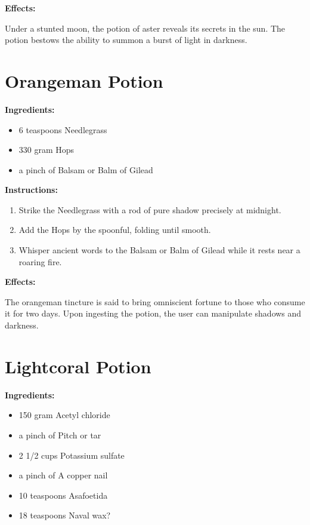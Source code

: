 \documentclass{article}
\begin{document}
\textbf{Effects:}

Under a stunted moon, the potion of aster reveals its secrets in the sun. The potion bestows the ability to summon a burst of light in darkness.

\newpage
\section*{Orangeman Potion}

\textbf{Ingredients:}

\begin{itemize}
  \item 6 teaspoons Needlegrass
  \item 330 gram Hops
  \item a pinch of Balsam or Balm of Gilead
\end{itemize}

\textbf{Instructions:}

\begin{enumerate}
  \item Strike the Needlegrass with a rod of pure shadow precisely at midnight.
  \item Add the Hops by the spoonful, folding until smooth.
  \item Whisper ancient words to the Balsam or Balm of Gilead while it rests near a roaring fire.
\end{enumerate}

\textbf{Effects:}

The orangeman tincture is said to bring omniscient fortune to those who consume it for two days. Upon ingesting the potion, the user can manipulate shadows and darkness.

\newpage
\section*{Lightcoral Potion}

\textbf{Ingredients:}

\begin{itemize}
  \item 150 gram Acetyl chloride
  \item a pinch of Pitch or tar
  \item 2 1/2 cups Potassium sulfate
  \item a pinch of A copper nail
  \item 10 teaspoons Asafoetida
  \item 18 teaspoons Naval wax?
\end{itemize}
\end{document}
